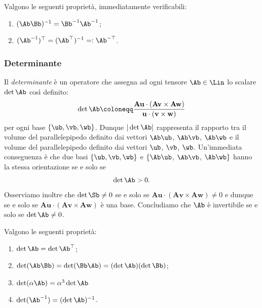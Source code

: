 
Valgono le seguenti proprietà, immediatamente verificabili:
\begin{enumerate}
	\item $(\Ab \Bb)^{-1}= \Bb^{-1}\Ab^{-1}$;
	\item $(\Ab^{-1})^\top=(\Ab ^\top)^{-1}=:\Ab^{-\top}$.
\end{enumerate}

\subsubsection{Determinante}
 Il \textit{determinante}  è un operatore che assegna ad ogni tensore $\Ab\in \Lin$ lo scalare $\det \Ab$ così definito:
\begin{equation}
	\det \Ab \coloneqq 	\frac{\mathbf{Au}\cdot(\mathbf{Av}\times\mathbf{Aw})}{\mathbf{u}\cdot(\mathbf{v}\times\mathbf{w})}
\end{equation}
per ogni  base $\{\ub, \vb, \wb\}$. Dunque $|\det\Ab|$ rappresenta il rapporto tra il volume del parallelepipedo definito dai vettori $\Ab \ub$, $\Ab\vb$, $\Ab \wb$ e il volume del parallelepipedo definito dai vettori $\ub$, $\vb$, $\wb$. Un'immediata conseguenza è che due basi $\{\ub, \vb, \wb\}$ e $\{\Ab \ub$, $\Ab\vb$, $\Ab \wb\}$  hanno la stessa orientazione se e solo se 
\begin{equation}
	\det \Ab >0.
\end{equation}
Osserviamo inoltre che $\det \Sb \neq 0$ se e solo se  $\mathbf{Au}\cdot(\mathbf{Av}\times\mathbf{Aw})\neq 0$ e dunque se e solo se $\mathbf{Au}\cdot(\mathbf{Av}\times\mathbf{Aw})$ è una base. Concludiamo che $\Ab$ è invertibile se e solo se $\det \Ab \neq 0$.

Valgono le seguenti proprietà:
\begin{enumerate}
	\item $\det \Ab =\det \Ab ^\top$;
	\item $\det (\Ab \Bb)=\det (\Bb \Ab)=(\det \Ab)(\det \Bb)$;
	\item $\det(\alpha \Ab)=\alpha^3 \det \Ab$
	\item $\det (\Ab^{-1})=(\det \Ab)^{-1}$.
\end{enumerate}

